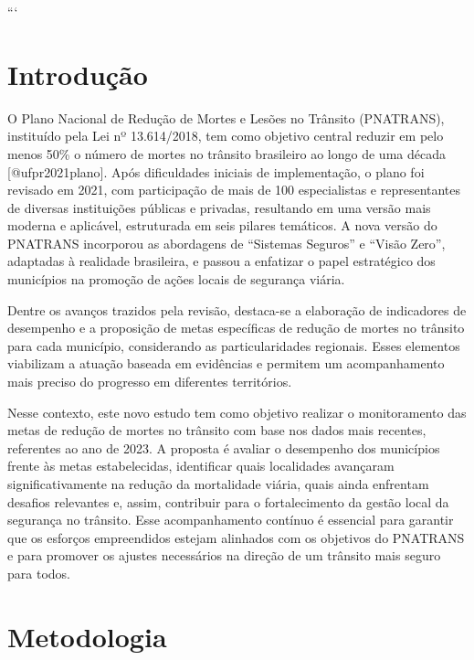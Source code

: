 \documentclass[
  letterpaper,
  DIV=11,
  numbers=noendperiod]{scrreprt}
\begin{document}
```


\chapter{Introdução}\label{introduuxe7uxe3o}

O Plano Nacional de Redução de Mortes e Lesões no Trânsito (PNATRANS),
instituído pela Lei nº 13.614/2018, tem como objetivo central reduzir em
pelo menos 50\% o número de mortes no trânsito brasileiro ao longo de
uma década {[}@ufpr2021plano{]}. Após dificuldades iniciais de
implementação, o plano foi revisado em 2021, com participação de mais de
100 especialistas e representantes de diversas instituições públicas e
privadas, resultando em uma versão mais moderna e aplicável, estruturada
em seis pilares temáticos. A nova versão do PNATRANS incorporou as
abordagens de ``Sistemas Seguros'' e ``Visão Zero'', adaptadas à
realidade brasileira, e passou a enfatizar o papel estratégico dos
municípios na promoção de ações locais de segurança viária.

Dentre os avanços trazidos pela revisão, destaca-se a elaboração de
indicadores de desempenho e a proposição de metas específicas de redução
de mortes no trânsito para cada município, considerando as
particularidades regionais. Esses elementos viabilizam a atuação baseada
em evidências e permitem um acompanhamento mais preciso do progresso em
diferentes territórios.

Nesse contexto, este novo estudo tem como objetivo realizar o
monitoramento das metas de redução de mortes no trânsito com base nos
dados mais recentes, referentes ao ano de 2023. A proposta é avaliar o
desempenho dos municípios frente às metas estabelecidas, identificar
quais localidades avançaram significativamente na redução da mortalidade
viária, quais ainda enfrentam desafios relevantes e, assim, contribuir
para o fortalecimento da gestão local da segurança no trânsito. Esse
acompanhamento contínuo é essencial para garantir que os esforços
empreendidos estejam alinhados com os objetivos do PNATRANS e para
promover os ajustes necessários na direção de um trânsito mais seguro
para todos.


\chapter{Metodologia}\label{metodologia}
\end{document}
